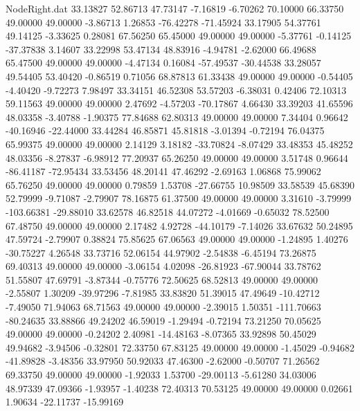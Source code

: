 \begin{filecontents}{NodeRight.dat}
  33.13827   52.86713   47.73147    -7.16819   -6.70262   70.10000   66.33750   49.00000   49.00000   -3.86713    1.26853  -76.42278  -71.45924
  33.17905   54.37761   49.14125    -3.33625    0.28081   67.56250   65.45000   49.00000   49.00000   -5.37761   -0.14125  -37.37838    3.14607
  33.22998   53.47134   48.83916    -4.94781   -2.62000   66.49688   65.47500   49.00000   49.00000   -4.47134    0.16084  -57.49537  -30.44538
  33.28057   49.54405   53.40420    -0.86519    0.71056   68.87813   61.33438   49.00000   49.00000   -0.54405   -4.40420   -9.72273    7.98497
  33.34151   46.52308   53.57203    -6.38031    0.42406   72.10313   59.11563   49.00000   49.00000    2.47692   -4.57203  -70.17867    4.66430
  33.39203   41.65596   48.03358    -3.40788   -1.90375   77.84688   62.80313   49.00000   49.00000    7.34404    0.96642  -40.16946  -22.44000
  33.44284   46.85871   45.81818    -3.01394   -0.72194   76.04375   65.99375   49.00000   49.00000    2.14129    3.18182  -33.70824   -8.07429
  33.48353   45.48252   48.03356    -8.27837   -6.98912   77.20937   65.26250   49.00000   49.00000    3.51748    0.96644  -86.41187  -72.95434
  33.53456   48.20141   47.46292    -2.69163    1.06868   75.99062   65.76250   49.00000   49.00000    0.79859    1.53708  -27.66755   10.98509
  33.58539   45.68390   52.79999    -9.71087   -2.79907   78.16875   61.37500   49.00000   49.00000    3.31610   -3.79999 -103.66381  -29.88010
  33.62578   46.82518   44.07272    -4.01669   -0.65032   78.52500   67.48750   49.00000   49.00000    2.17482    4.92728  -44.10179   -7.14026
  33.67632   50.24895   47.59724    -2.79907    0.38824   75.85625   67.06563   49.00000   49.00000   -1.24895    1.40276  -30.75227    4.26548
  33.73716   52.06154   44.97902    -2.54838   -6.45194   73.26875   69.40313   49.00000   49.00000   -3.06154    4.02098  -26.81923  -67.90044
  33.78762   51.55807   47.69791    -3.87344   -0.75776   72.50625   68.52813   49.00000   49.00000   -2.55807    1.30209  -39.97296   -7.81985
  33.83820   51.39015   47.49649   -10.42712   -7.49050   71.94063   68.71563   49.00000   49.00000   -2.39015    1.50351 -111.70663  -80.24635
  33.88866   49.24202   46.59019    -1.29494   -0.72194   73.21250   70.05625   49.00000   49.00000   -0.24202    2.40981  -14.48163   -8.07365
  33.92898   50.45029   49.94682    -3.94506   -0.32801   72.33750   67.83125   49.00000   49.00000   -1.45029   -0.94682  -41.89828   -3.48356
  33.97950   50.92033   47.46300    -2.62000   -0.50707   71.26562   69.33750   49.00000   49.00000   -1.92033    1.53700  -29.00113   -5.61280
  34.03006   48.97339   47.09366    -1.93957   -1.40238   72.40313   70.53125   49.00000   49.00000    0.02661    1.90634  -22.11737  -15.99169

\end{filecontents}
